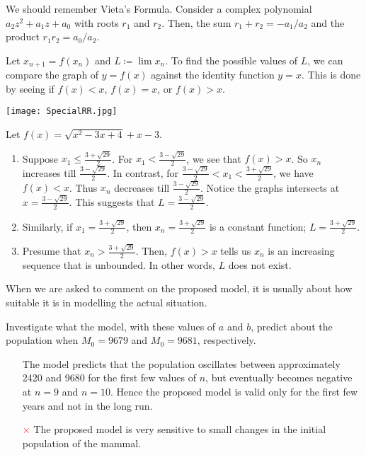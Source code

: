 \documentclass[oneside]{book}
\begin{document}
\begin{note}\hypertarget{vieta}{}
  We should remember Vieta's Formula. Consider a complex polynomial \(a_2 z^2+a_1 z+a_0\) with roots \(r_1\) and \(r_2\). Then, the sum \(r_1+r_2=-a_1/a_2\) and the product \(r_1r_2=a_0/a_2\).
\end{note}
\begin{note}
  Let \(x_{n+1}=f(x_n)\) and \(L\coloneq \lim{x_n}\). To find the possible values of \(L\), we can compare the graph of \(y=f(x)\) against the identity function \(y=x\). This is done by seeing if \(f(x)<x\), \(f(x)=x\), or \(f(x)>x\).
\end{note}
\begin{example}{}{}
  \begin{center}
    \texttt{[image: SpecialRR.jpg]}
  \end{center}
  Let \(f(x)=\sqrt{x^2-3x+4}+x-3\).
  \begin{enumerate}
    \item Suppose \(x_1 \leq \frac{3+\sqrt{29}}{2}\). For \(x_1<\frac{3-\sqrt{29}}{2}\), we see that \(f(x)>x\). So \(x_n\) increases till \(\frac{3-\sqrt{29}}{2}\). In contrast, for \(\frac{3-\sqrt{29}}{2}<x_1<\frac{3+\sqrt{29}}{2}\), we have \(f(x)<x\). Thus \(x_n\) decreases till \(\frac{3-\sqrt{29}}{2}\). Notice the graphs intersects at \(x=\frac{3-\sqrt{29}}{2}\). This suggests that \(L=\frac{3-\sqrt{29}}{2}\).
    \item Similarly, if \(x_1=\frac{3+\sqrt{29}}{2}\), then \(x_n=\frac{3+\sqrt{29}}{2}\) is a constant function; \(L=\frac{3+\sqrt{29}}{2}\).
    \item Presume that \(x_n>\frac{3+\sqrt{29}}{2}\). Then, \(f(x)>x\) tells us \(x_n\) is an increasing sequence that is unbounded. In other words, \(L\) does not exist.
  \end{enumerate}
\end{example}
\begin{note}
  When we are asked to comment on the proposed model, it is usually about how suitable it is in modelling the actual situation.
\end{note}
\begin{example}{}{}
  Investigate what the model, with these values of \(a\) and \(b\), predict about the population when \(M_0=9679\) and \(M_0=9681\), respectively. 
  \begin{enumerate}
    \item[\textcolor{green!70!black}{\checkmark}] The model predicts that the population oscillates between  approximately 2420 and 9680 for the first few values of \(n\), but eventually becomes negative at \(n=9\) and \(n=10\). Hence the proposed model is valid only for the first few years and not in the long run. 
    \item[\textcolor{red}{\(\times\)}] The proposed model is very sensitive to small changes in the initial population of the mammal. 
  \end{enumerate}
\end{example}
\end{document}
